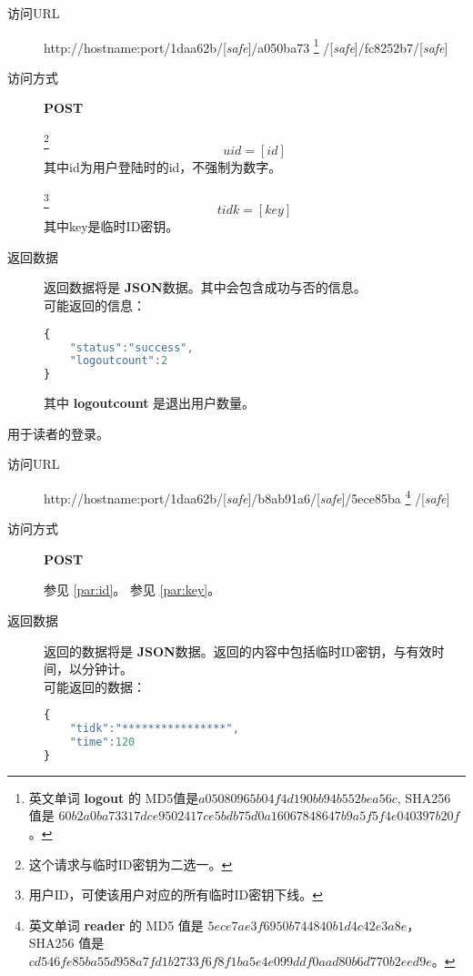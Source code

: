 \documentclass[UTF8]{article}
\def\safe{/[\textit{safe}]}
\def\POST{\colorbox[rgb]{0.77,0.53,0.97}{\textbf{POST}}}
\def\bfJSON{\textbf{JSON}}
\def\viaurl{\item[{\quad\colorbox[rgb]{0.47,0.88,0.89}{访问URL}}]}
\def\viareq#1{\item[{\quad\colorbox[rgb]{0.57,0.88,0.99}{访问方式}}] #1}
\def\rtdata{\item[{\quad\colorbox[rgb]{0.70,0.9,0.59}{返回数据}}]}
\begin{document}
    \begin{description}
        \viaurl http://hostname:port/1daa62b\safe/a050ba73
        \footnote{
            英文单词 \textbf{logout} 的
            MD5值是$a05080965b04f4d190bb94b552bea56c $,
            SHA256 值是
            $60b2a0ba73317dce9502417ce5bdb75d0a16067848647b9a5f5f4e040397b20f$。
        }
        \safe/fc8252b7\safe

        \viareq \POST

        \label{par:logout:id}
        \footnote{这个请求与临时ID密钥为二选一。}
        $$uid=[id]$$
        其中id为用户登陆时的id，不强制为数字。

        \label{par:logout:tidk}
        \footnote{用户ID，可使该用户对应的所有临时ID密钥下线。}
        $$tidk=[key]$$
        其中key是临时ID密钥。

        \rtdata 返回数据将是 \bfJSON 数据。其中会包含成功与否的信息。
        \\可能返回的信息：
        \begin{lstlisting}[language=JavaScript]
{
    "status":"success",
    "logoutcount":2
}
        \end{lstlisting}\label{par:logout:example}
        其中 \textbf{logoutcount} 是退出用户数量。
    \end{description}






		用于读者的登录。
		\begin{description}

		\viaurl http://hostname:port/1daa62b\safe /b8ab91a6\safe/5ece85ba
        \footnote{
            英文单词 \textbf{reader} 的
            MD5 值是
            $5ece7ae3f6950b744840b1d4c42e3a8e$，
            SHA256 值是
            $cd546fe85ba55d958a7fd1b2733f6f8f1ba5e4e099ddf0aad80b6d770b2eed9e$。
            }
        \safe

        \viareq \POST

         参见 \ref{par:id}。
         参见 \ref{par:key}。
        \rtdata 返回的数据将是 \bfJSON 数据。返回的内容中包括临时ID密钥，与有效时间，以分钟计。
        \\可能返回的数据：
        \begin{lstlisting}[language=JavaScript]
{
    "tidk":"****************",
    "time":120
}
        \end{lstlisting}
		\end{description}
\end{document}
